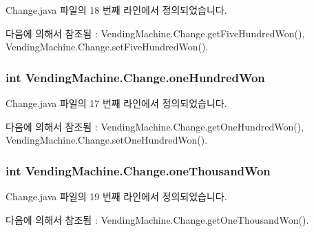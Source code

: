 Change.\+java 파일의 18 번째 라인에서 정의되었습니다.



다음에 의해서 참조됨 \+:  Vending\+Machine.\+Change.\+get\+Five\+Hundred\+Won(), Vending\+Machine.\+Change.\+set\+Five\+Hundred\+Won().

\subsubsection[{\texorpdfstring{one\+Hundred\+Won}{oneHundredWon}}]{\setlength{\rightskip}{0pt plus 5cm}int Vending\+Machine.\+Change.\+one\+Hundred\+Won\hspace{0.3cm}{\ttfamily [private]}}\hypertarget{class_vending_machine_1_1_change_a82f462b3cad2218fb4c8ca15f4915374}{}\label{class_vending_machine_1_1_change_a82f462b3cad2218fb4c8ca15f4915374}


Change.\+java 파일의 17 번째 라인에서 정의되었습니다.



다음에 의해서 참조됨 \+:  Vending\+Machine.\+Change.\+get\+One\+Hundred\+Won(), Vending\+Machine.\+Change.\+set\+One\+Hundred\+Won().

\subsubsection[{\texorpdfstring{one\+Thousand\+Won}{oneThousandWon}}]{\setlength{\rightskip}{0pt plus 5cm}int Vending\+Machine.\+Change.\+one\+Thousand\+Won\hspace{0.3cm}{\ttfamily [private]}}\hypertarget{class_vending_machine_1_1_change_a949998e6d45fdaa880ebfa7ae2e06240}{}\label{class_vending_machine_1_1_change_a949998e6d45fdaa880ebfa7ae2e06240}


Change.\+java 파일의 19 번째 라인에서 정의되었습니다.



다음에 의해서 참조됨 \+:  Vending\+Machine.\+Change.\+get\+One\+Thousand\+Won().

